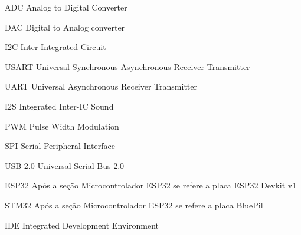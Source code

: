 







\frenchspacing 


	\imprimircapa

	\imprimirfolhaderosto*

	\listoffigures*
	\cleardoublepage

	\listofquadros*
	\cleardoublepage


	\begin{siglas}
		\item[ADC] Analog to Digital Converter
		\item[DAC] Digital to Analog converter
		\item[I2C] Inter-Integrated Circuit
		\item[USART] Universal Synchronous Asynchronous Receiver Transmitter
		\item[UART] Universal Asynchronous Receiver Transmitter
		\item[I2S] Integrated Inter-IC Sound
		\item[PWM] Pulse Width Modulation
		\item[SPI] Serial Peripheral Interface
		\item[USB 2.0] Universal Serial Bus 2.0
		\item[ESP32] Após a seção Microcontrolador ESP32 se refere a placa ESP32 Devkit v1
		\item[STM32] Após a seção Microcontrolador ESP32 se refere a placa BluePill
		\item[IDE] Integrated Development Environment
	\end{siglas}

	\tableofcontents*
	\cleardoublepage


\textual

	

